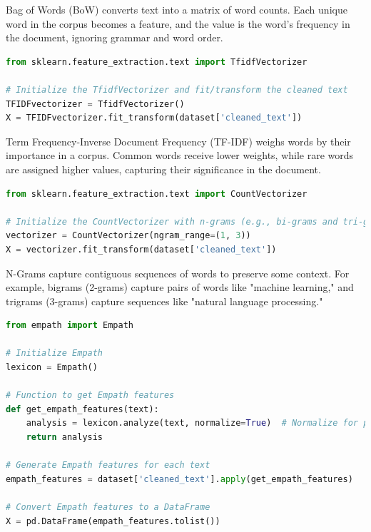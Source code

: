 \noindent
Bag of Words (BoW) converts text into a matrix of word counts. Each unique word in the corpus becomes a feature, and the value is the word's frequency in the document, ignoring grammar and word order.

\begin{tcolorbox}[colback=gray!5!white, colframe=gray!80!black, boxrule=0.5pt, title=TF-IDF]
\begin{lstlisting}[language=Python]
from sklearn.feature_extraction.text import TfidfVectorizer

# Initialize the TfidfVectorizer and fit/transform the cleaned text
TFIDFvectorizer = TfidfVectorizer()
X = TFIDFvectorizer.fit_transform(dataset['cleaned_text'])
\end{lstlisting}
\end{tcolorbox}

\noindent
Term Frequency-Inverse Document Frequency (TF-IDF) weighs words by their importance in a corpus. Common words receive lower weights, while rare words are assigned higher values, capturing their significance in the document.

\begin{tcolorbox}[colback=gray!5!white, colframe=gray!80!black, boxrule=0.5pt, title=N-Gram]
\begin{lstlisting}[language=Python]
from sklearn.feature_extraction.text import CountVectorizer

# Initialize the CountVectorizer with n-grams (e.g., bi-grams and tri-grams)
vectorizer = CountVectorizer(ngram_range=(1, 3))
X = vectorizer.fit_transform(dataset['cleaned_text'])
\end{lstlisting}
\end{tcolorbox}
    
\noindent
N-Grams capture contiguous sequences of words to preserve some context. For example, bigrams (2-grams) capture pairs of words like "machine learning," and trigrams (3-grams) capture sequences like "natural language processing."

\begin{tcolorbox}[colback=gray!5!white, colframe=gray!80!black, boxrule=0.5pt, title=LIWC (Empath)]
\begin{lstlisting}[language=Python]
from empath import Empath

# Initialize Empath
lexicon = Empath()

# Function to get Empath features
def get_empath_features(text):
    analysis = lexicon.analyze(text, normalize=True)  # Normalize for proportions
    return analysis

# Generate Empath features for each text
empath_features = dataset['cleaned_text'].apply(get_empath_features)

# Convert Empath features to a DataFrame
X = pd.DataFrame(empath_features.tolist())
\end{lstlisting}
\end{tcolorbox}

